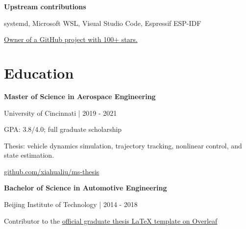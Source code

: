 \documentclass[11pt,a4paper]{article}
\begin{document}
\textbf{Upstream contributions}\par
systemd, Microsoft WSL, Visual Studio Code, Espressif ESP-IDF

\href{https://github.com/xiahualiu/wg_gaming_installer}{Owner of a GitHub project with 100+ stars.}

\section*{Education}
\textbf{Master of Science in Aerospace Engineering}\par
University of Cincinnati | 2019 - 2021\par
GPA: 3.8/4.0; full graduate scholarship\par
Thesis: vehicle dynamics simulation, trajectory tracking, nonlinear control, and state estimation.\par
\href{https://github.com/xiahualiu/ms-thesis}{github.com/xiahualiu/ms-thesis}\par
\smallskip
\textbf{Bachelor of Science in Automotive Engineering}\par
Beijing Institute of Technology | 2014 - 2018\par
Contributor to the \href{https://www.overleaf.com/latex/templates/beijing-institute-of-technology-bit-2024-version-thesis-template/bxjqynnmbjtk}{official graduate thesis LaTeX template on Overleaf}\par
\end{document}
